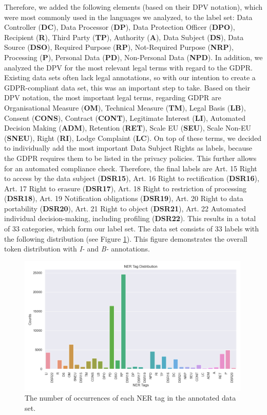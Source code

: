 \documentclass[a4paper,
               biblatex,     %
               hyphens,      %
               ]{jacow}
\begin{document}
Therefore, we added the following elements (based on their DPV notation), which were most commonly used in the languages we analyzed, to the label set: Data Controller (\textbf{DC}), Data Processor (\textbf{DP}), Data Protection Officer (\textbf{DPO}), Recipient (\textbf{R}), Third Party (\textbf{TP}), Authority (\textbf{A}), Data Subject (\textbf{DS}), Data Source (\textbf{DSO}), Required Purpose (\textbf{RP}), Not-Required Purpose (\textbf{NRP}), Processing (\textbf{P}), Personal Data (\textbf{PD}), Non-Personal Data (\textbf{NPD}). 
In addition, we analyzed the DPV for the most relevant legal terms with regard to the GDPR. 
Existing data sets often lack legal annotations, so with our intention to create a GDPR-compliant data set, this was an important step to take. 
Based on their DPV notation, the most important legal terms, regarding GDPR are Organisational Measure (\textbf{OM}), Technical Measure (\textbf{TM}), Legal Basis (\textbf{LB}), Consent (\textbf{CONS}), Contract (\textbf{CONT}), Legitimate Interest (\textbf{LI}), Automated Decision Making (\textbf{ADM}), Retention (\textbf{RET}), Scale EU (\textbf{SEU}), Scale Non-EU (\textbf{SNEU}), Right (\textbf{RI}), Lodge Complaint (\textbf{LC}). 
On top of these terms, we decided to individually add the most important Data Subject Rights as labels, because the GDPR requires them to be listed in the privacy policies. 
This further allows for an automated compliance check. 
Therefore, the final labels are Art. 15 Right to access by the data subject (\textbf{DSR15}), Art. 16 Right to rectification (\textbf{DSR16}), Art. 17 Right to erasure (\textbf{DSR17}), Art. 18 Right to restriction of processing (\textbf{DSR18}), Art. 19 Notification obligations (\textbf{DSR19}), Art. 20 Right to data portability (\textbf{DSR20}), Art. 21 Right to object (\textbf{DSR21}), Art. 22 Automated individual decision-making, including profiling (\textbf{DSR22}).
This results in a total of 33 categories, which form our label set. 
The data set consists of 33 labels with the following distribution (see Figure \ref{fig:tag_distribution}). This figure demonstrates the overall token distribution with \textit{I-} and \textit{B-} annotations. 

\begin{figure}
    \centering
        \includegraphics[width=0.99\textwidth]{images/tag_distribution.png}
    \caption{The number of occurrences of each NER tag in the annotated data set.}
    \label{fig:tag_distribution}
\end{figure}
\end{document}
